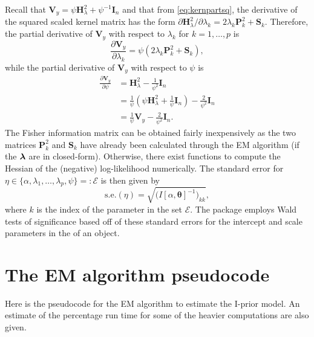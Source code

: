 \documentclass[english, 11pt]{article}
\begin{document}
Recall that $\mathbf V_y = \psi\mathbf H_\lambda^2 + \psi^{-1}\mathbf I_n$ and that from \eqref{eq:kernpartsq}, the derivative of the squared scaled kernel matrix has the form $\partial\mathbf H_\lambda^2 / \partial\lambda_k = 2\lambda_k\mathbf P_k^2 + \mathbf S_k$. Therefore, the partial derivative of $\mathbf V_y$ with respect to $\lambda_k$ for $k = 1,\dots,p$ is
\[
	\frac{\partial\mathbf V_y}{\partial\lambda_k} = \psi\left(2\lambda_k\mathbf P_k^2 + \mathbf S_k \right),
\]
while the partial derivative of $\mathbf V_y$ with respect to $\psi$ is
\begin{align*}
	\frac{\partial\mathbf V_y}{\partial\psi} &= \mathbf H_\lambda^2 - \frac{1}{\psi^2}\mathbf I_n \\
	&= \frac{1}{\psi}\left(\psi\mathbf H_\lambda^2 + \frac{1}{\psi}\mathbf I_n \right) - \frac{2}{\psi^2}\mathbf I_n \\
	&= \frac{1}{\psi}\mathbf V_y - \frac{2}{\psi^2}\mathbf I_n.
\end{align*}
The Fisher information matrix can be obtained fairly inexpensively as the two matrices $\mathbf P_k^2$ and $\mathbf S_k$ have already been calculated through the EM algorithm (if the $\boldsymbol\lambda$ are in closed-form). Otherwise, there exist  functions to compute the Hessian of the (negative) log-likelihood numerically. The standard error for $\eta \in \{ \alpha, \lambda_1, \dots, \lambda_p, \psi \} =: \mathcal E$ is then given by
\[
	\text{s.e.}(\eta) = \sqrt{\big(I[\alpha,\boldsymbol{\theta}]^{-1}\big)_{kk}},
\]
where $k$ is the index of the parameter in the set $\mathcal E$. The  package employs Wald tests of significance based off of these standard errors for the intercept and scale parameters in the  of an  object.

\section{The EM algorithm pseudocode}
\label{apx:a}

Here is the pseudocode for the EM algorithm to estimate the I-prior model. An estimate of the percentage run time for some of the heavier computations are also given.
\end{document}
